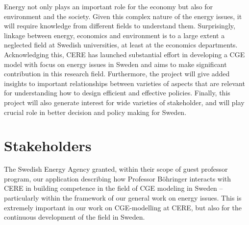 Energy not only plays an important role for the economy but also for environment and the society. Given this complex nature of the energy issues, it will require knowledge from different fields to understand them.
Surprisingly, linkage between energy, economics and environment is to a large extent a neglected field at Swedish universities, at least at the economics departments.
Acknowledging this, CERE has launched substantial effort in developing a CGE model with focus on energy issues in Sweden and aims to make significant contribution in this research field.
Furthermore, the project will give added insights to important relationships between varieties of aspects that are relevant for understanding how to design efficient and effective policies. Finally, this project will also generate interest for wide varieties of stakeholder, and will play crucial role in better decision and policy making for Sweden.

\section{Stakeholders}
The Swedish Energy Agency granted, within their scope of guest professor program, our application describing how Professor Böhringer interacts with CERE in building competence in the field of CGE modeling in Sweden – particularly within the framework of our general work on energy issues. This is extremely important in our work on CGE-modelling at CERE, but also for the continuous development of the field in Sweden.

